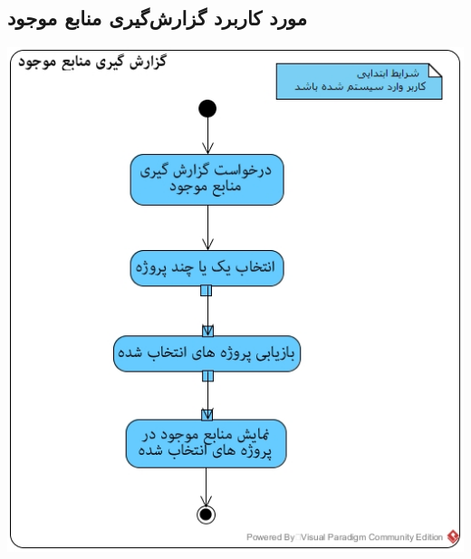 \documentclass{article}
\begin{document}
\subsection*{مورد کاربرد گزارش‌گیری منابع موجود}
\vspace{2cm}
\begin{center}
\includegraphics[width=\textwidth]{ActivityDiagrams/40.jpg}
\end{center}

\newpage
\vspace{2cm}
\end{document}
